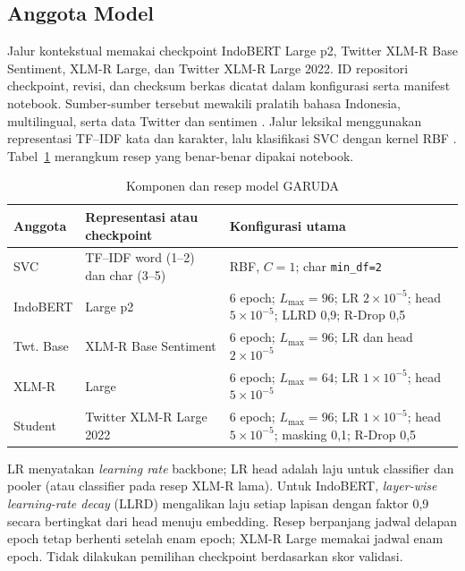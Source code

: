 \subsection{Anggota Model}
Jalur kontekstual memakai checkpoint IndoBERT Large p2, Twitter XLM-R Base
Sentiment, XLM-R Large, dan Twitter XLM-R Large 2022. ID repositori checkpoint,
revisi, dan checksum berkas dicatat dalam konfigurasi serta manifest notebook.
Sumber-sumber tersebut mewakili pralatih bahasa Indonesia, multilingual, serta data Twitter dan sentimen
\cite{wilie20,conneau20,barbieri22}. Jalur leksikal menggunakan
representasi TF--IDF kata dan karakter, lalu klasifikasi SVC dengan kernel
RBF \cite{salton88,cortes95}. Tabel~\ref{tab:resep-garuda} merangkum resep
yang benar-benar dipakai notebook.

\begin{table}[t]
\caption{Komponen dan resep model GARUDA}
\label{tab:resep-garuda}
\centering
\footnotesize
\setlength{\tabcolsep}{3pt}
\begin{tabular}{@{}p{}p{}p{}@{}}
\toprule
Anggota & Representasi atau checkpoint & Konfigurasi utama \\
\midrule
SVC & TF--IDF word (1--2) dan char (3--5) & RBF, $C=1$; char \texttt{min\_df=2} \\
IndoBERT & Large p2 & 6 epoch; $L_{\max}=96$; LR $2\times10^{-5}$; head $5\times10^{-5}$; LLRD 0,9; R-Drop 0,5 \\
Twt. Base & XLM-R Base Sentiment & 6 epoch; $L_{\max}=96$; LR dan head $2\times10^{-5}$ \\
XLM-R & Large & 6 epoch; $L_{\max}=64$; LR $1\times10^{-5}$; head $5\times10^{-5}$ \\
Student & Twitter XLM-R Large 2022 & 6 epoch; $L_{\max}=96$; LR $1\times10^{-5}$; head $5\times10^{-5}$; masking 0,1; R-Drop 0,5 \\
\bottomrule
\end{tabular}
\end{table}

LR menyatakan \textit{learning rate} backbone; LR head adalah laju untuk
classifier dan pooler (atau classifier pada resep XLM-R lama). Untuk
IndoBERT, \textit{layer-wise learning-rate decay} (LLRD) mengalikan laju
setiap lapisan dengan faktor 0,9 secara bertingkat dari head menuju embedding.
Resep berpanjang jadwal delapan epoch tetap berhenti setelah enam epoch;
XLM-R Large memakai jadwal enam epoch. Tidak dilakukan pemilihan checkpoint
berdasarkan skor validasi.

